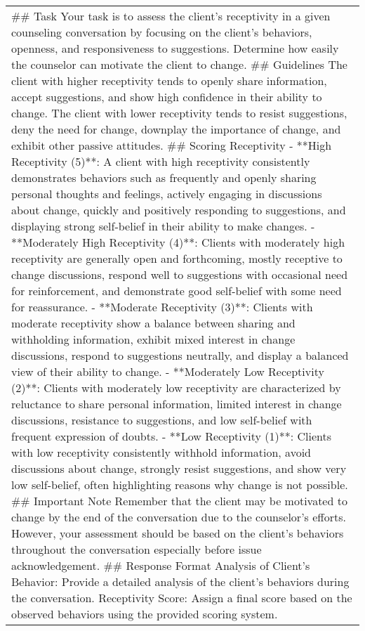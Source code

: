 \begin{table*}[tb]
\begin{tabularx}{\textwidth}{X}
\toprule
\#\# Task \newline Your task is to assess the client's receptivity in a given counseling conversation by focusing on the client's behaviors, openness, and responsiveness to suggestions. Determine how easily the counselor can motivate the client to change. \newline \#\# Guidelines \newline The client with higher receptivity tends to openly share information, accept suggestions, and show high confidence in their ability to change. The client with lower receptivity tends to resist suggestions, deny the need for change, downplay the importance of change, and exhibit other passive attitudes. \newline \#\# Scoring Receptivity \newline - **High Receptivity (5)**: A client with high receptivity consistently demonstrates behaviors such as frequently and openly sharing personal thoughts and feelings, actively engaging in discussions about change, quickly and positively responding to suggestions, and displaying strong self-belief in their ability to make changes. \newline - **Moderately High Receptivity (4)**: Clients with moderately high receptivity are generally open and forthcoming, mostly receptive to change discussions, respond well to suggestions with occasional need for reinforcement, and demonstrate good self-belief with some need for reassurance. \newline - **Moderate Receptivity (3)**: Clients with moderate receptivity show a balance between sharing and withholding information, exhibit mixed interest in change discussions, respond to suggestions neutrally, and display a balanced view of their ability to change. \newline - **Moderately Low Receptivity (2)**: Clients with moderately low receptivity are characterized by reluctance to share personal information, limited interest in change discussions, resistance to suggestions, and low self-belief with frequent expression of doubts. \newline - **Low Receptivity (1)**: Clients with low receptivity consistently withhold information, avoid discussions about change, strongly resist suggestions, and show very low self-belief, often highlighting reasons why change is not possible. \newline \#\# Important Note \newline Remember that the client may be motivated to change by the end of the conversation due to the counselor's efforts. However, your assessment should be based on the client's behaviors throughout the conversation especially before issue acknowledgement. \newline \#\# Response Format \newline Analysis of Client's Behavior: Provide a detailed analysis of the client's behaviors during the conversation. \newline Receptivity Score: Assign a final score based on the observed behaviors using the provided scoring system. 
\end{tabularx}
\end{table*}
